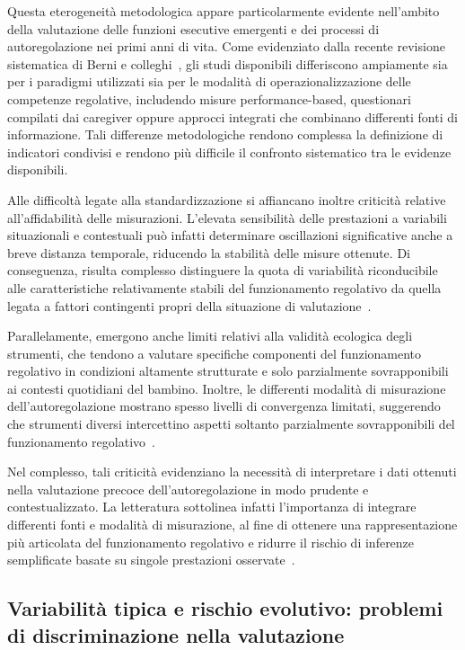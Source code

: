             Questa eterogeneità metodologica appare particolarmente evidente nell'ambito della valutazione delle funzioni esecutive emergenti e dei processi di autoregolazione nei primi anni di vita. Come evidenziato dalla recente revisione sistematica di Berni e colleghi~\cite{berni2025}, gli studi disponibili differiscono ampiamente sia per i paradigmi utilizzati sia per le modalità di operazionalizzazione delle competenze regolative, includendo misure performance-based, questionari compilati dai caregiver oppure approcci integrati che combinano differenti fonti di informazione. Tali differenze metodologiche rendono complessa la definizione di indicatori condivisi e rendono più difficile il confronto sistematico tra le evidenze disponibili.

            Alle difficoltà legate alla standardizzazione si affiancano inoltre criticità relative all'affidabilità delle misurazioni. L'elevata sensibilità delle prestazioni a variabili situazionali e contestuali può infatti determinare oscillazioni significative anche a breve distanza temporale, riducendo la stabilità delle misure ottenute. Di conseguenza, risulta complesso distinguere la quota di variabilità riconducibile alle caratteristiche relativamente stabili del funzionamento regolativo da quella legata a fattori contingenti propri della situazione di valutazione~\cite{blair2015,hughes2002}.

            Parallelamente, emergono anche limiti relativi alla validità ecologica degli strumenti, che tendono a valutare specifiche componenti del funzionamento regolativo in condizioni altamente strutturate e solo parzialmente sovrapponibili ai contesti quotidiani del bambino. Inoltre, le differenti modalità di misurazione dell'autoregolazione mostrano spesso livelli di convergenza limitati, suggerendo che strumenti diversi intercettino aspetti soltanto parzialmente sovrapponibili del funzionamento regolativo~\cite{toplak2013,duckworth2011}.

            Nel complesso, tali criticità evidenziano la necessità di interpretare i dati ottenuti nella valutazione precoce dell'autoregolazione in modo prudente e contestualizzato. La letteratura sottolinea infatti l'importanza di integrare differenti fonti e modalità di misurazione, al fine di ottenere una rappresentazione più articolata del funzionamento regolativo e ridurre il rischio di inferenze semplificate basate su singole prestazioni osservate~\cite{mcclelland2012,snyder2021}.

        \subsection{Variabilità tipica e rischio evolutivo: problemi di discriminazione nella valutazione}
        \label{sec:3_2_4}

